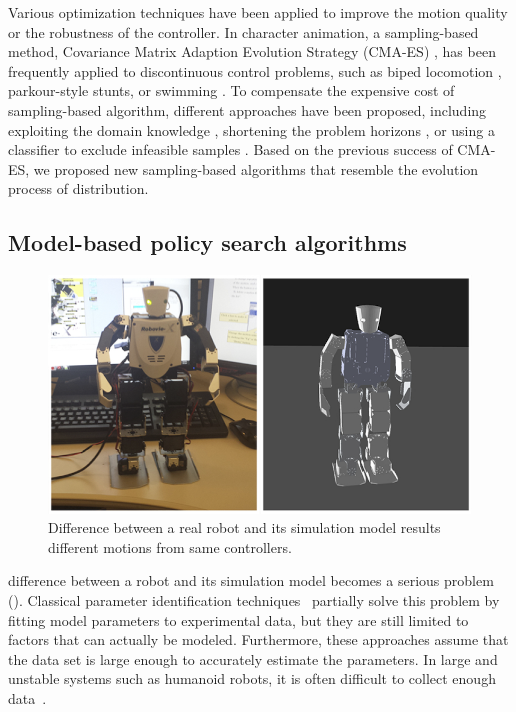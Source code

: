Various optimization techniques have been applied to improve the
motion quality or the robustness of the controller.  In character
animation, a sampling-based method, Covariance Matrix Adaption
Evolution Strategy (CMA-ES) \cite{Hansen:2004:CMA}, has been
frequently applied to discontinuous control problems, such as biped
locomotion \cite{Wang:2009:OWC,Wang:2010:OWC,Wang:2012:OLC},
parkour-style stunts\cite{Liu:2012:TRC,Ha:2014:ITD}, or swimming
\cite{Tan:2011:ASC}.  To compensate the expensive cost of
sampling-based algorithm, different approaches have been proposed,
including exploiting the domain knowledge
\cite{Wang:2009:OWC,Wang:2010:OWC,Wang:2012:OLC}, shortening the
problem horizons \cite{Sok:2007:SBB}, or using a classifier to exclude
infeasible samples \cite{Ha:2014:ITD}. Based on the previous success
of CMA-ES, we proposed new sampling-based algorithms that resemble the
evolution process of distribution.

\subsection{Model-based policy search algorithms}
\begin{figure}[htbp]
\center
  \includegraphics[width=0.9\linewidth]{images/related_robovies.png}
  \caption{Difference between a real robot and its simulation model
  results different motions from same controllers.}
 \label{fig:related_robovies}
\end{figure}

difference between a robot and its simulation model becomes a serious 
problem  ().
Classical parameter identification
techniques~\cite{bib-khalil-identification} partially solve this
problem by fitting model parameters to experimental data, but they
are still limited to factors that can actually be modeled. 
Furthermore, these approaches assume that the data set is large enough
to accurately estimate the parameters.
In large and unstable systems such as humanoid robots, it is often
difficult to collect enough data~\cite{bib-humanoids2011-calibration}.

